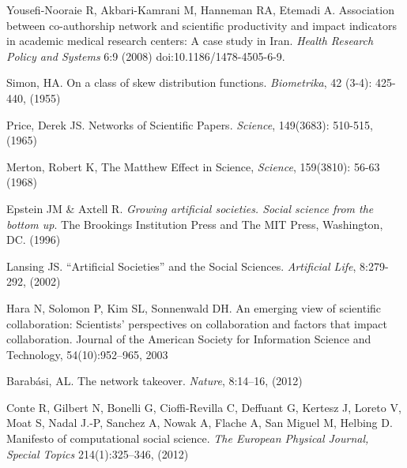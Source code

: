 \documentclass[11pt]{article}
\begin{document}
\begin{thebibliography}{100}
 Yousefi-Nooraie R, Akbari-Kamrani M, Hanneman RA, Etemadi A. Association between co-authorship network and scientific productivity and impact indicators in academic medical research centers: A case study in Iran. \textit{Health Research Policy and Systems} 6:9 (2008) doi:10.1186/1478-4505-6-9.
  


 Simon, HA. On a class of skew distribution functions. \textit{Biometrika}, 42 (3-4): 425-440, (1955)

 Price, Derek JS. Networks of Scientific Papers. \textit{Science}, 149(3683): 510-515, (1965)

 Merton, Robert K, The Matthew Effect in Science, \textit{Science}, 159(3810): 56-63 (1968)

 Epstein JM \& Axtell R. \textit{Growing artificial societies. Social science from the bottom up}. The
  Brookings Institution Press and The MIT Press, Washington, DC. (1996)

 Lansing JS. ``Artificial Societies'' and the Social
  Sciences. \textit{Artificial Life}, 8:279-292, (2002)

 Hara N, Solomon P, Kim SL, Sonnenwald DH. An emerging
  view of scientific collaboration: Scientists' perspectives on collaboration
  and factors that impact collaboration. Journal of the American Society for
  Information Science and Technology, 54(10):952–965, 2003
   

 Barab\'asi, AL. The network takeover. \textit{Nature}, 8:14–16, (2012)

 Conte R, Gilbert N, Bonelli G, Cioffi-Revilla C,
  Deffuant G, Kertesz J, Loreto V, Moat S, Nadal J.-P,  Sanchez A, Nowak A,
  Flache  A, San Miguel M, Helbing D. Manifesto of computational social
  science. \textit{The European Physical Journal, Special Topics} 214(1):325–346, (2012) 
  
%
\end{thebibliography}
\end{document}
